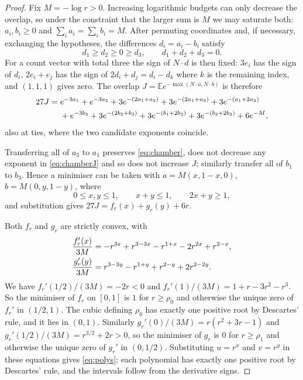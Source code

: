 \documentclass[11pt,a4paper]{article}
\theoremstyle{definition}\newtheorem{definition}[theorem]{Definition}
\theoremstyle{remark}\newtheorem{remark}[theorem]{Remark}
\newcommand{\E}{\mathbb E}
\begin{document}
\begin{proof}
Fix $M=-\log r>0$. Increasing logarithmic budgets can only decrease the overlap, so under the constraint that the larger sum is $M$ we may saturate both:
$a_i,b_i\ge0$ and $\sum_i a_i=\sum_i b_i=M$.
After permuting coordinates and, if necessary, exchanging the hypotheses, the differences $d_i=a_i-b_i$ satisfy
\begin{equation}\label{eq:chamber}
d_1\ge d_2\ge0\ge d_3,\qquad d_1+d_2+d_3=0.
\end{equation}
For a count vector with total three the sign of $N\cdot d$ is then fixed: $3e_i$ has the sign of $d_i$, $2e_i+e_j$ has the sign of $2d_i+d_j=d_i-d_k$ where $k$ is the remaining index, and $(1,1,1)$ gives zero. The overlap $J=\E e^{-\max(N\cdot a,N\cdot b)}$ is therefore
\begin{align}\label{eq:chamberJ}
27J={}&e^{-3a_1}+e^{-3a_2}
 +3e^{-(2a_1+a_2)}+3e^{-(2a_1+a_3)}+3e^{-(a_1+2a_2)}\notag\\
&+e^{-3b_3}+3e^{-(2b_2+b_3)}+3e^{-(b_1+2b_3)}+3e^{-(b_2+2b_3)}+6e^{-M},
\end{align}
also at ties, where the two candidate exponents coincide.

Transferring all of $a_3$ to $a_1$ preserves \eqref{eq:chamber}, does not decrease any exponent in \eqref{eq:chamberJ} and so does not increase $J$; similarly transfer all of $b_1$ to $b_3$. Hence a minimiser can be taken with
$a=M(x,1-x,0)$, $b=M(0,y,1-y)$, where
\begin{equation}\label{eq:feas}
0\le x,y\le1,\qquad x+y\le1,\qquad 2x+y\ge1,
\end{equation}
and substitution gives $27J=f_r(x)+g_r(y)+6r$.

Both $f_r$ and $g_r$ are strictly convex, with
\begin{align}\label{eq:derivatives}
\frac{f_r'(x)}{3M}&=-r^{3x}+r^{3-3x}-r^{1+x}-2r^{2x}+r^{2-x},\\
\frac{g_r'(y)}{3M}&=r^{3-3y}-r^{1+y}+r^{2-y}+2r^{2-2y}.\notag
\end{align}
We have $f_r'(1/2)/(3M)=-2r<0$ and $f_r'(1)/(3M)=1+r-3r^2-r^3$. So the minimiser of $f_r$ on $[0,1]$ is $1$ for $r\ge\rho_0$ and otherwise the unique zero of $f_r'$ in $(1/2,1)$. The cubic defining $\rho_0$ has exactly one positive root by Descartes' rule, and it lies in $(0,1)$. Similarly $g_r'(0)/(3M)=r(r^2+3r-1)$ and $g_r'(1/2)/(3M)=r^{3/2}+2r>0$, so the minimiser of $g_r$ is $0$ for $r\ge\rho_1$ and otherwise the unique zero of $g_r'$ in $(0,1/2)$. Substituting $u=r^x$ and $v=r^y$ in these equations gives \eqref{eq:polys}; each polynomial has exactly one positive root by Descartes' rule, and the intervals follow from the derivative signs.


\end{proof}
\end{document}
